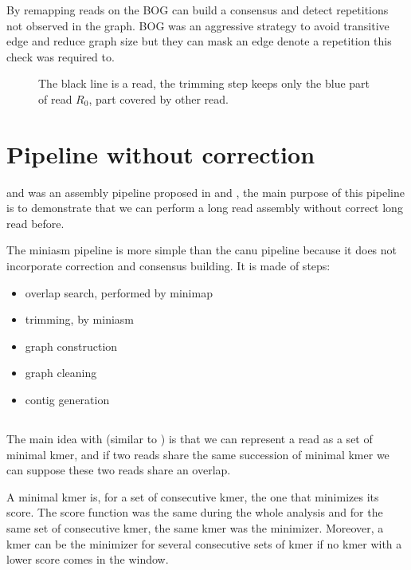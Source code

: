 \documentclass[main]{subfiles}
\begin{document}
By remapping reads on the BOG \canu can build a consensus and detect repetitions not observed in the graph. BOG was an aggressive strategy to avoid transitive edge and reduce graph size but they can mask an edge denote a repetition this check was required to.

\begin{figure}[ht]
    \centering
    
    \caption{The black line is a read, the \canu trimming step keeps only the blue part of read $R_0$, part covered by other read.}
    \label{sota:fig:canu:remapping}
\end{figure}

\section{Pipeline without correction \miniasm} \label{section:sota:miniasm}

\minimap and \miniasm was an assembly pipeline proposed in \cite{miniasm_minimap} and \cite{minimap2}, the main purpose of this pipeline is to demonstrate that we can perform a long read assembly without correct long read before.

The miniasm pipeline is more simple than the canu pipeline because it does not incorporate correction and consensus building. It is made of steps:
\begin{itemize}
    \item overlap search, performed by minimap
    \item trimming, by miniasm
    \item graph construction 
    \item graph cleaning
    \item contig generation
\end{itemize}


\subsection{\minimap} \label{subsec:sota:miniasm:minimap}

The main idea with \minimap (similar to \mhap) is that we can represent a read as a set of minimal kmer, and if two reads share the same succession of minimal kmer we can suppose these two reads share an overlap.

A minimal kmer is, for a set of consecutive kmer, the one that minimizes its score. The score function was the same during the whole analysis and for the same set of consecutive kmer, the same kmer was the minimizer. Moreover, a kmer can be the minimizer for several consecutive sets of kmer if no kmer with a lower score comes in the window. 
\end{document}
